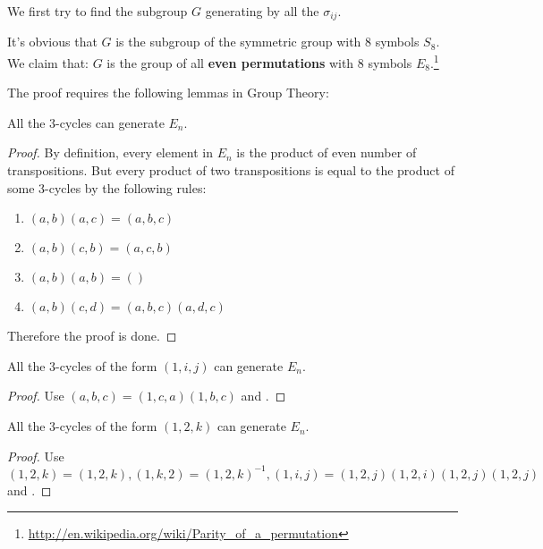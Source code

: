 We first try to find the subgroup $ G$ generating by all the $ \sigma_{ij}$.

It's obvious that $G$ is the subgroup of the symmetric group with 8 symbols $ S_8$.
We claim that: $G$ is the group of all \textbf{even permutations} with 8 symbols $ E_8$.\footnote{\url{http://en.wikipedia.org/wiki/Parity_of_a_permutation}}

The proof requires the following lemmas in Group Theory:
\begin{lemma}
  \label{lemma:1}
  All the 3-cycles can generate $E_n$.
  \begin{proof}
    By definition, every element in $ E_n$ is the product of even number of transpositions.
    But every product of two transpositions is equal to the product of some 3-cycles by the following rules:
    \begin{enumerate}
      \item $ (a,b)(a,c) = (a,b,c)$
      \item $ (a,b)(c,b) = (a,c,b)$
      \item $(a,b)(a,b) = () $
      \item $(a,b)(c,d) = (a,b,c)(a,d,c) $
    \end{enumerate}
    Therefore the proof is done.
  \end{proof}
\end{lemma}

\begin{lemma}
  \label{lemma:2}
All the 3-cycles of the form $ (1,i,j)$ can generate $ E_n$.
\begin{proof}
  Use $(a,b,c) = (1,c,a)(1,b,c) $ and .
\end{proof}
\end{lemma}

\begin{lemma}
  \label{lemma:3}
All the 3-cycles of the form $ (1,2,k)$ can generate $ E_n$.
\begin{proof}
Use $ (1,2,k) = (1,2,k), (1,k,2) = (1,2,k)^{-1}, (1,i,j) = (1,2,j)(1,2,i)(1,2,j)(1,2,j)$ and .
\end{proof}
\end{lemma}


